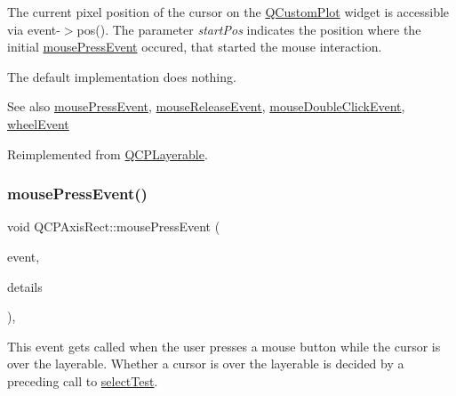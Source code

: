 The current pixel position of the cursor on the \mbox{\hyperlink{class_q_custom_plot}{Q\+Custom\+Plot}} widget is accessible via {\ttfamily event-\/$>$pos()}. The parameter {\itshape start\+Pos} indicates the position where the initial \mbox{\hyperlink{class_q_c_p_axis_rect_aa9a7c807eaa4666870ac94aa6abc4dde}{mouse\+Press\+Event}} occured, that started the mouse interaction.

The default implementation does nothing.

\begin{DoxySeeAlso}{See also}
\mbox{\hyperlink{class_q_c_p_axis_rect_aa9a7c807eaa4666870ac94aa6abc4dde}{mouse\+Press\+Event}}, \mbox{\hyperlink{class_q_c_p_axis_rect_a6c89b988d3a0b93c0878f0ebdb5037f4}{mouse\+Release\+Event}}, \mbox{\hyperlink{class_q_c_p_layerable_a4171e2e823aca242dd0279f00ed2de81}{mouse\+Double\+Click\+Event}}, \mbox{\hyperlink{class_q_c_p_axis_rect_a93eeaa0c127d6d6fe8171b2455080262}{wheel\+Event}} 
\end{DoxySeeAlso}


Reimplemented from \mbox{\hyperlink{class_q_c_p_layerable_a9eee1ba47fd69be111059ca3881933e4}{Q\+C\+P\+Layerable}}.

\mbox{\label{class_q_c_p_axis_rect_aa9a7c807eaa4666870ac94aa6abc4dde}} 
\subsubsection{\texorpdfstring{mouse\+Press\+Event()}{mousePressEvent()}}
{\footnotesize\ttfamily void Q\+C\+P\+Axis\+Rect\+::mouse\+Press\+Event (\begin{DoxyParamCaption}\item[{Q\+Mouse\+Event $\ast$}]{event,  }\item[{const Q\+Variant \&}]{details }\end{DoxyParamCaption})\hspace{0.3cm}{\ttfamily [protected]}, {\ttfamily [virtual]}}

This event gets called when the user presses a mouse button while the cursor is over the layerable. Whether a cursor is over the layerable is decided by a preceding call to \mbox{\hyperlink{class_q_c_p_layout_element_ae97f483cccedadbf18ea4525ef240ee4}{select\+Test}}.

